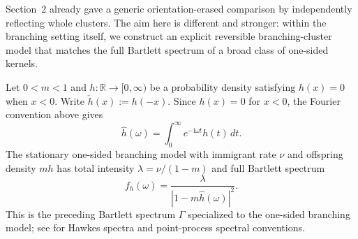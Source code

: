 \documentclass[aap,press]{apt} \volno{00} \partno{00}
\renewcommand{\ii}{\mathrm{i}}
\newcommand{\1}{\mathbf{1}}
\numberwithin{equation}{section}
\begin{document}
Section~2 already gave a generic orientation-erased comparison by independently reflecting whole clusters. The aim here is different and stronger: within the branching setting itself, we construct an explicit reversible branching-cluster model that matches the full Bartlett spectrum of a broad class of one-sided kernels.

Let $0<m<1$ and $h:\mathbb{R}\rightarrow[0,\infty)$ be a probability density satisfying $h(x)=0$ when $x<0$. Write $\check h(x):=h(-x)$. Since \(h(x)=0\) for \(x<0\), the Fourier convention above gives
\[
\widehat h(\omega)=\int_0^\infty e^{-\ii\omega t}h(t)\,dt.
\]
The stationary one-sided branching model with immigrant rate $\nu$ and offspring density $mh$ has total intensity $\lambda=\nu/(1-m)$ and full Bartlett spectrum
\[
f_h(\omega)=\frac{\lambda}{|1-m\widehat h(\omega)|^2}.
\]
This is the preceding Bartlett spectrum $\Gamma$ specialized to the one-sided branching model; see \cite{daley2003introduction,Hawkes1971} for Hawkes spectra and point-process spectral conventions.
\end{document}
